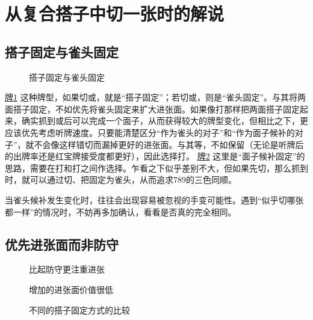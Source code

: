 \chapter[【一向听的技术】两面形的选择 其二]{从复合搭子中切一张时的解说}

\section{搭子固定与雀头固定}
\begin{figure}[h]
    \caption{搭子固定与雀头固定}
    \label{lec7:pai1-2}
    \par\bigskip
\end{figure}\hyperref[lec7:pai1-2]{牌1}
这种牌型，如果切或，就是“搭子固定”；若切或，则是“雀头固定”。与其将两面搭子固定，不如优先将雀头固定来扩大进张面。如果像打那样把两面搭子固定起来，确实抓到或后可以完成一个面子，从而获得较大的牌型变化，但相比之下，更应该优先考虑听牌速度。只要能清楚区分“作为雀头的对子”和“作为面子候补的对子”，就不会像这样错切而漏掉更好的进张面。与其等，不如保留（无论是听牌后的出牌率还是红宝牌接受度都更好），因此选择打。
\hyperref[lec7:pai1-2]{牌2}
这里是“面子候补固定”的思路，需要在打和打之间作选择。乍看之下似乎差别不大，但如果先切，那么抓到时，就可以通过切、把固定为雀头，从而追求789的三色同顺。

当雀头候补发生变化时，往往会出现容易被忽视的手变可能性。遇到“似乎切哪张都一样”的情况时，不妨再多加确认，看看是否真的完全相同。

\section{优先进张面而非防守}

\begin{figure}[h]
    \caption{比起防守更注重进张}
    \label{lec7:pai3}
\end{figure}
\begin{figure}[h]
    \caption{增加的进张面价值很低}
    \label{lec7:pai4}
\end{figure}
\begin{figure}[h]
    \caption{不同的搭子固定方式的比较}
    \label{lec7:pai5-7}
    \par\bigskip
    \par\bigskip
\end{figure}

